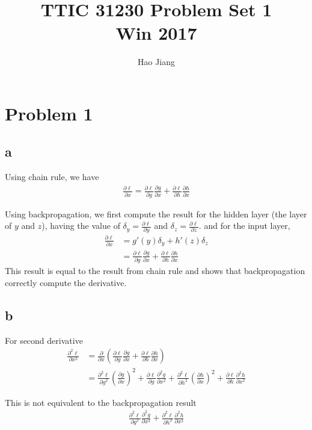 \documentclass{article}
\title{TTIC 31230 Problem Set 1 \\ Win 2017}
\author{Hao Jiang}
\begin{document}
\maketitle

\section*{Problem 1}
\subsection*{a}
Using chain rule, we have
\begin{align*}
\frac{\partial \ell}{\partial x} = \frac{\partial \ell}{\partial
g}\frac{\partial g}{\partial x} +\frac{\partial \ell}{\partial h}\frac{\partial
h}{\partial x}
\end{align*}

Using backpropagation, we first compute the result for the hidden layer (the
layer of $y$ and $z$), having the value of $\delta_y = \frac{\partial
\ell}{\partial y}$ and $\delta_z = \frac{\partial \ell}{\partial z}$.
and for the input layer,
\begin{align*}
\frac{\partial \ell}{\partial x} &= g'(y)\delta_y + h'(z)\delta_z\\
&= \frac{\partial \ell}{\partial
g}\frac{\partial g}{\partial x} +\frac{\partial \ell}{\partial h}\frac{\partial
h}{\partial x}
\end{align*}
This result is equal to the result from chain rule and shows that
backpropagation correctly compute the derivative.
\subsection*{b}

For second derivative
\begin{align*}
\frac{\partial^2 \ell}{\partial x^2} &= 
\frac{\partial}{\partial x}(\frac{\partial \ell}{\partial g}\frac{\partial g}{\partial x} +\frac{\partial \ell}{\partial h}\frac{\partial
h}{\partial x}) \\
&= \frac{\partial^2 \ell}{\partial g^2}\left(\frac{\partial g}{\partial
x}\right)^2 +\frac{\partial \ell}{\partial g}\frac{\partial^2 g}{\partial x^2}
+\frac{\partial^2 \ell}{\partial h^2}\left(\frac{\partial h}{\partial
x}\right)^2 +\frac{\partial \ell}{\partial h}\frac{\partial^2 h}{\partial x^2}
\end{align*}

This is not equivalent to the backpropagation result
\begin{align*}
\frac{\partial^2 \ell}{\partial g^2}\frac{\partial^2 g}{\partial x^2} +
\frac{\partial^2 \ell}{\partial h^2}\frac{\partial^2 h}{\partial x^2}
\end{align*}
\end{document}
